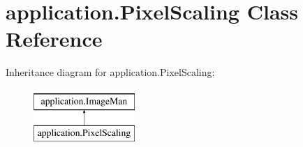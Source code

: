 \hypertarget{classapplication_1_1_pixel_scaling}{}\section{application.\+Pixel\+Scaling Class Reference}
\label{classapplication_1_1_pixel_scaling}
Inheritance diagram for application.\+Pixel\+Scaling\+:\begin{figure}[H]
\begin{center}
\leavevmode
\includegraphics[height=2.000000cm]{classapplication_1_1_pixel_scaling}
\end{center}
\end{figure}
